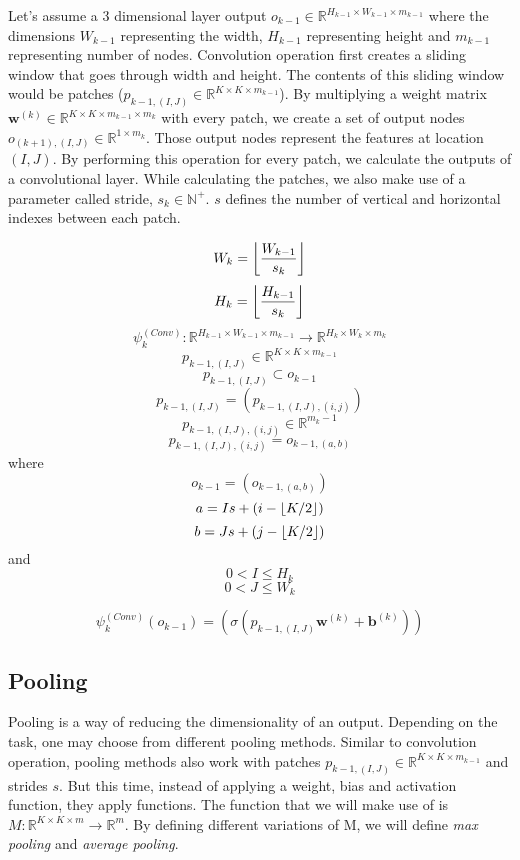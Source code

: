 Let's assume a 3 dimensional layer output $o_{k-1} \in \mathbb{R}^{H_{k-1} \times W_{k-1} \times m_{k-1}}$ where the dimensions $W_{k-1}$ representing the width, $H_{k-1}$ representing height and $m_{k-1}$ representing number of nodes. Convolution operation first creates a sliding window that goes through width and height. The contents of this sliding window would be patches ($p_{k-1,(I,J)} \in \mathbb{R}^{K \times K \times m_{k-1}}$). By multiplying a weight matrix $\mathbf{w}^{(k)} \in \mathbb{R}^{K \times K \times m_{k-1} \times m_k}$ with every patch, we create a set of output nodes $o_{(k+1),(I,J)} \in \mathbb{R}^{1 \times m_k}$. Those output nodes represent the features at location $(I,J)$. By performing this operation for every patch, we calculate the outputs of a convolutional layer. While calculating the patches, we also make use of a parameter called stride, $s_k \in \mathbb{N}^+$. $s$ defines the number of vertical and horizontal indexes between each patch.

$$ W_k = \floor*{\frac{W_{k-1}}{s_k}}$$
$$ H_k = \floor*{\frac{H_{k-1}}{s_k}}$$
$$ \psi_{k}^{(Conv)} : \mathbb{R}^{H_{k-1} \times W_{k-1} \times m_{k-1} } \rightarrow \mathbb{R}^{ H_k \times W_k \times m_k} $$
$$ p_{k-1,(I,J)} \in \mathbb{R}^{K \times K \times m_{k-1}} $$
$$ p_{k-1,(I,J)} \subset o_{k-1}$$
$$ p_{k-1,(I,J)} = (p_{k-1,(I,J),(i,j)}) $$
$$ p_{k-1,(I,J),(i,j)} \in \mathbb{R}^{m_k-1} $$
$$ p_{k-1,(I,J),(i,j)} = o_{k-1,(a,b)} $$
where
$$ o_{k-1} = (o_{k-1,(a,b)})$$
$$ a = Is + (i - \floor*{K/2}) $$
$$ b = Js + (j - \floor*{K/2}) $$
and 
$$ 0 < I \leq H_k$$
$$ 0 < J \leq W_k$$

$$\psi_{k}^{(Conv)}(o_{k-1}) = (\sigma(p_{k-1,(I,J)} \mathbf{w}^{(k)} + \mathbf{b}^{(k)})) $$

\subsection{Pooling}
Pooling is a way of reducing the dimensionality of an output. Depending on the task, one may choose from different pooling methods. Similar to convolution operation, pooling methods also work with patches $p_{k-1,(I,J)} \in \mathbb{R}^{K \times K \times m_{k-1}}$ and strides $s$. But this time, instead of applying a weight, bias and activation function, they apply functions. 
The function that we will make use of is $ M : \mathbb{R}^{K \times K \times m} \rightarrow \mathbb{R}^{m}$. By defining different variations of M, we will define \textit{max pooling} and \textit{average pooling}.
